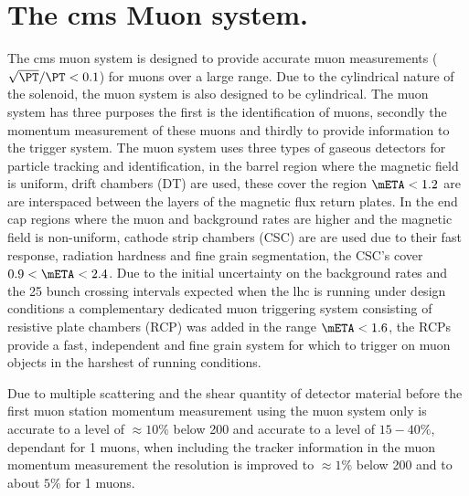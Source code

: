 \section{The \ac{cms} Muon system.} %
\label{sec:the_cms_muon_system}
The \ac{cms} muon system is designed to provide accurate muon \PT measurements 
($\sqrt{\PT}/\PT < 0.1$) for muons over a large \PT range. Due to the 
cylindrical nature of the solenoid, the muon system is also designed to be 
cylindrical. The muon system has three purposes the first is the identification 
of muons, secondly the momentum measurement of these muons and thirdly to 
provide information to the trigger system.
The muon system uses three types of gaseous detectors for particle tracking and 
identification, in the barrel region where the magnetic field is uniform, drift 
chambers (DT) are used, these cover the region $\mETA < 1.2$ are are 
interspaced between the layers of the magnetic flux return plates. In the end 
cap regions where the muon and background rates are higher and the magnetic 
field is non-uniform, cathode strip chambers (CSC) are are used due to their 
fast response, radiation hardness and fine grain segmentation, the CSC's cover 
$0.9 < \mETA < 2.4$. Due to the initial uncertainty on the background rates and 
the \unit{25}{\nano\second} bunch crossing intervals expected when the \ac{lhc} 
is running under design conditions a complementary dedicated muon triggering 
system consisting of resistive plate chambers (RCP) was added in the range 
$\mETA < 1.6$, the RCPs provide a fast, independent and fine grain system for 
which to trigger on muon objects in the harshest of running conditions.

Due to multiple scattering and the shear quantity of detector material before 
the first muon station momentum measurement using the muon system only is 
accurate to a level of $\approx10\%$ below \unit{200}{\GeV} and accurate to a 
level of $15-40\%$, \mETA dependant for \unit{1}{\TeV} muons, when including 
the tracker information in the muon momentum measurement the resolution is 
improved to $\approx1\%$ below \unit{200}{\GeV} and to about $5\%$ for 
\unit{1}{\TeV} muons.

